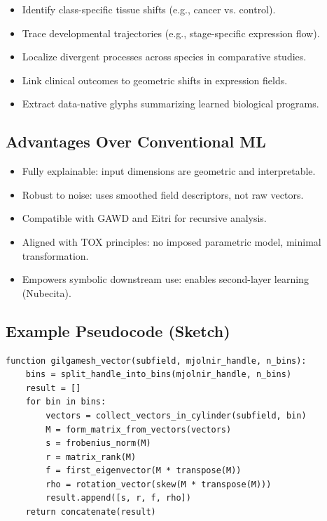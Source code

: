         \begin{itemize}
            \item Identify class-specific tissue shifts (e.g., cancer vs. control).
            \item Trace developmental trajectories (e.g., stage-specific expression flow).
            \item Localize divergent processes across species in comparative studies.
            \item Link clinical outcomes to geometric shifts in expression fields.
            \item Extract data-native glyphs summarizing learned biological programs.
        \end{itemize}

    \subsection{Advantages Over Conventional ML}

        \begin{itemize}
            \item Fully explainable: input dimensions are geometric and interpretable.
            \item Robust to noise: uses smoothed field descriptors, not raw vectors.
            \item Compatible with GAWD and Eitri for recursive analysis.
            \item Aligned with TOX principles: no imposed parametric model, minimal transformation.
            \item Empowers symbolic downstream use: enables second-layer learning (Nubecita).
        \end{itemize}

    \subsection{Example Pseudocode (Sketch)}

        \begin{verbatim}
function gilgamesh_vector(subfield, mjolnir_handle, n_bins):
    bins = split_handle_into_bins(mjolnir_handle, n_bins)
    result = []
    for bin in bins:
        vectors = collect_vectors_in_cylinder(subfield, bin)
        M = form_matrix_from_vectors(vectors)
        s = frobenius_norm(M)
        r = matrix_rank(M)
        f = first_eigenvector(M * transpose(M))
        rho = rotation_vector(skew(M * transpose(M)))
        result.append([s, r, f, rho])
    return concatenate(result)
\end{verbatim}